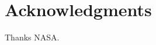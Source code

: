 \documentclass[conf]{new-aiaa}
\begin{document}

% 






\section*{Acknowledgments}

Thanks \gls*{NASA}.







% 
\end{document}
